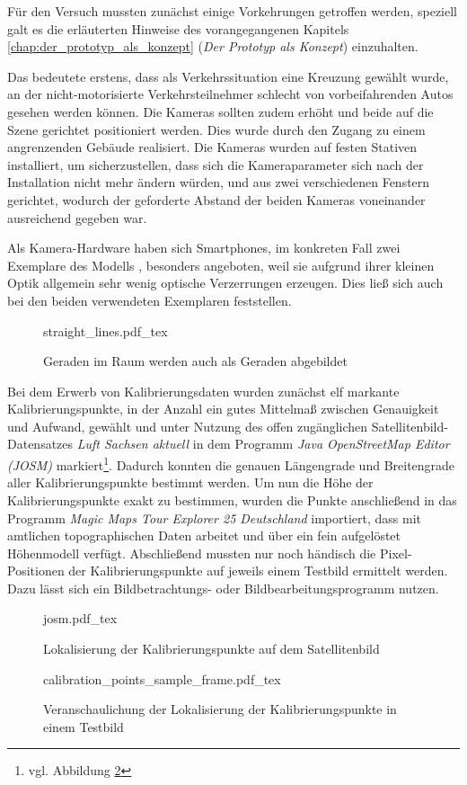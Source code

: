 Für den Versuch mussten zunächst einige Vorkehrungen getroffen werden, speziell galt es die erläuterten Hinweise des vorangegangenen Kapitels \ref{chap:der_prototyp_als_konzept} (\emph{Der Prototyp als Konzept}) einzuhalten.\kleinerabstand

\noindent Das bedeutete erstens, dass als Verkehrssituation eine Kreuzung gewählt wurde, an der nicht-motorisierte Verkehrsteilnehmer schlecht von vorbeifahrenden Autos gesehen werden können. Die Kameras sollten zudem erhöht und beide auf die Szene gerichtet positioniert werden. Dies wurde durch den Zugang zu einem angrenzenden Gebäude realisiert. Die Kameras wurden auf festen Stativen installiert, um sicherzustellen, dass sich die Kameraparameter sich nach der Installation nicht mehr ändern würden, und aus zwei verschiedenen Fenstern gerichtet, wodurch der geforderte Abstand der beiden Kameras voneinander ausreichend gegeben war.\kleinerabstand

\noindent Als Kamera-Hardware haben sich Smartphones, im konkreten Fall zwei Exemplare des Modells , besonders angeboten, weil sie aufgrund ihrer kleinen Optik allgemein sehr wenig optische Verzerrungen erzeugen. Dies ließ sich auch bei den beiden verwendeten Exemplaren feststellen.

\begin{figure}[H]
	\centering
	\def\svgwidth{12cm}
	{straight_lines.pdf_tex}
	\caption{Geraden im Raum werden auch als Geraden abgebildet}
	\label{fig:straight_lines}
\end{figure}
\kleinerabstand

Bei dem Erwerb von Kalibrierungsdaten wurden zunächst elf markante Kalibrierungspunkte, in der Anzahl ein gutes Mittelmaß zwischen Genauigkeit und Aufwand, gewählt und unter Nutzung des offen zugänglichen Satellitenbild-Datensatzes \emph{Luft Sachsen aktuell} \cite{geosn} in dem Programm \emph{Java OpenStreetMap Editor (JOSM)} \cite{josm} markiert\footnote{vgl. Abbildung \ref{fig:josm}}. Dadurch konnten die genauen Längengrade und Breitengrade aller Kalibrierungspunkte bestimmt werden. Um nun die Höhe der Kalibrierungspunkte exakt zu bestimmen, wurden die Punkte anschließend in das Programm \emph{Magic Maps Tour Explorer 25 Deutschland} \cite{tourexplorer} importiert, dass mit amtlichen topographischen Daten arbeitet und über ein fein aufgelöstet Höhenmodell verfügt. Abschließend mussten nur noch händisch die Pixel-Positionen der Kalibrierungspunkte auf jeweils einem Testbild ermittelt werden. Dazu lässt sich ein Bildbetrachtungs- oder Bildbearbeitungsprogramm nutzen.

\begin{figure}[H]
	\centering
	\def\svgwidth{10cm}
	{josm.pdf_tex}
	\caption{Lokalisierung der Kalibrierungspunkte auf dem Satellitenbild}
	\label{fig:josm}
\end{figure}

\begin{figure}[H]
	\centering
	\def\svgwidth{10cm}
	{calibration_points_sample_frame.pdf_tex}
	\caption{Veranschaulichung der Lokalisierung der Kalibrierungspunkte in einem Testbild}
	\label{fig:calibration_points_sample_frame}
\end{figure}
